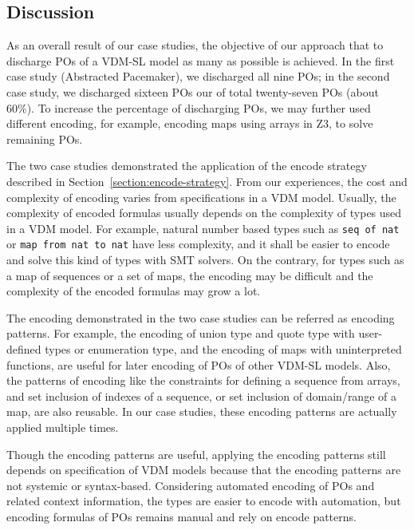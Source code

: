\subsection{Discussion}

As an overall result of our case studies, the objective of our approach that to discharge POs of a VDM-SL model as many as possible is achieved. In the first case study (Abstracted Pacemaker), we discharged all nine POs; in the second case study, we discharged sixteen POs our of total twenty-seven POs (about 60\%). To increase the percentage of discharging POs, we may further used different encoding, for example, encoding maps using arrays in Z3, to solve remaining POs.

The two case studies demonstrated the application of the encode strategy described in Section~\ref{section:encode-strategy}. From our experiences, the cost and complexity of encoding varies from specifications in a VDM model. Usually, the complexity of encoded formulas usually depends on the complexity of types used in a VDM model. For example, natural number based types such as {\tt seq of nat} or {\tt map from nat to nat} have less complexity, and it shall be easier to encode and solve this kind of types with SMT solvers. On the contrary, for types such as a map of sequences or a set of maps, the encoding may be difficult and the complexity of the encoded formulas may grow a lot.

The encoding demonstrated in the two case studies can be referred as encoding patterns. For example, the encoding of union type and quote type with user-defined types or enumeration type, and the encoding of maps with uninterpreted functions, are useful for later encoding of POs of other VDM-SL models. Also, the patterns of encoding like the constraints for defining a sequence from arrays, and set inclusion of indexes of a sequence, or set inclusion of domain/range of a map, are also reusable. In our case studies, these encoding patterns are actually applied multiple times. 

Though the encoding patterns are useful, applying the encoding patterns still depends on specification of VDM models because that the encoding patterns are not systemic or syntax-based. Considering automated encoding of POs and related context information, the types are easier to encode with automation, but encoding formulas of POs remains manual and rely on encode patterns.

